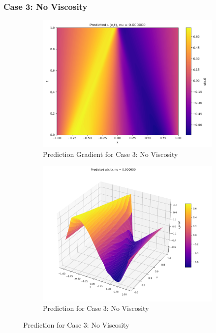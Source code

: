 \documentclass[11pt]{article}
\begin{document}
\subsubsection{Case 3: No Viscosity}
\begin{figure}[h!]
    \centering
    \begin{subfigure}[b]{0.48\textwidth}
        \includegraphics[width=\textwidth]{1D_PredGrad_NU3.png}
        \caption{Prediction Gradient for Case 3: No Viscosity}
        \label{fig:PredGrad_NU3}
    \end{subfigure}
    \hfill
    \begin{subfigure}[b]{0.48\textwidth}
        \includegraphics[width=\textwidth]{1D_Pred_NU3.png}
        \caption{Prediction for Case 3: No Viscosity}
        \label{fig:Pred_NU3}
    \end{subfigure}
    \caption{Prediction for Case 3: No Viscosity}
    \label{fig:PredTotal_NU3}
\end{figure}
\end{document}
